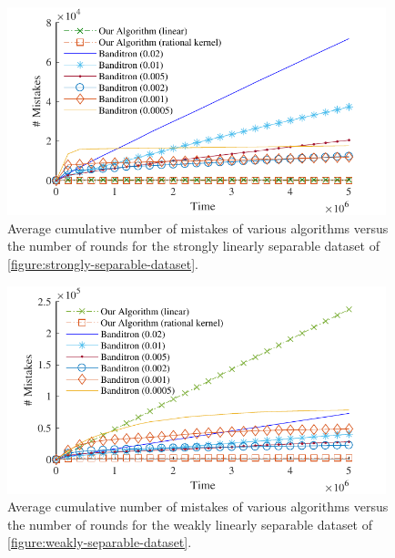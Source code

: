 \begin{minipage}{.45\textwidth}
\begin{figure}[H]
\centering
\includegraphics[width=0.98\textwidth]{figures/strong3}
\caption{Average cumulative number of mistakes of various algorithms versus the
number of rounds for the strongly linearly separable dataset of
\autoref{figure:strongly-separable-dataset}.}
\label{figure:number-of-mistakes-strongly-separable-dataset}
\end{figure}
\end{minipage}
\hfill
\begin{minipage}{.45\textwidth}
\begin{figure}[H]
\centering
\includegraphics[width=0.98\textwidth]{figures/weak3}
\caption{Average cumulative number of mistakes of various algorithms versus the
number of rounds for the weakly linearly separable dataset of
\autoref{figure:weakly-separable-dataset}.}
\label{figure:number-of-mistakes-weakly-separable-dataset}
\end{figure}
\end{minipage}
